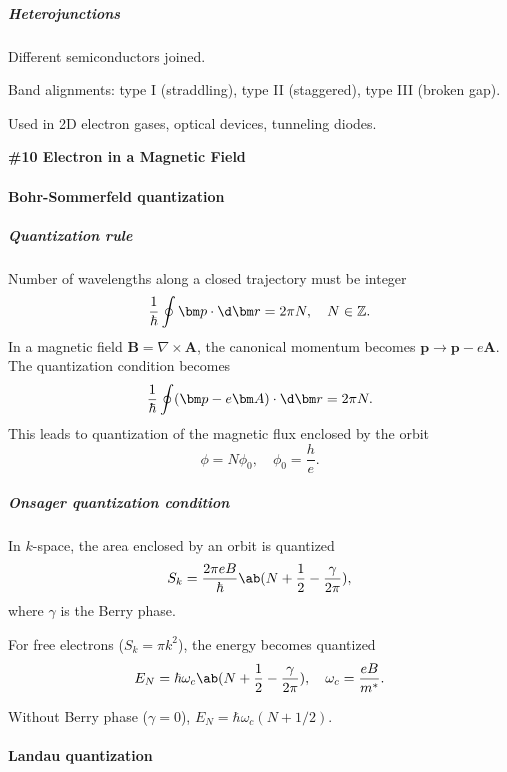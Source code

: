 \subparagraph{Heterojunctions}

\begin{enumext}
  \item Different semiconductors joined.
  \item Band alignments: type I (straddling), type II (staggered),
  type III (broken gap).
  \item Used in 2D electron gases, optical devices, tunneling diodes.
\end{enumext}

\begin{framed}\large\bfseries
  \#10 Electron in a Magnetic Field
\end{framed}

\paragraph{Bohr-Sommerfeld quantization}

\subparagraph{Quantization rule}\leavevmode

Number of wavelengths along a closed trajectory must be integer
\[
  \frac{1}{\hbar} \oint \bm p \cdot \d\bm r = 2\pi N, \quad N \in \mathbb Z.
\]
In a magnetic field $\bm B = \nabla \times \bm A$, the canonical momentum
becomes $\bm p \rightarrow \bm p - e\bm A$. The quantization condition becomes
\[
  \frac{1}{\hbar} \oint (\bm p - e\bm A) \cdot \d\bm r = 2\pi N.
\]
This leads to quantization of the magnetic flux enclosed by the orbit
\[
  \phi = N \phi_0, \quad \phi_0 = \frac he.
\]

\subparagraph{Onsager quantization condition}

\begin{enumext}
  \item In $k$-space, the area enclosed by an orbit is quantized
    \[
      S_k = \frac{2\pi eB}{\hbar} \ab(N + \frac12 - \frac{\gamma}{2\pi}),
    \]
    where $\gamma$ is the Berry phase.
  \item For free electrons ($S_k = \pi k^2$), the energy becomes quantized
    \[
      E_N = \hbar \omega_c \ab(N + \frac12 - \frac{\gamma}{2\pi}), \quad
      \omega_c = \frac{eB}{m^*}.
    \]
  \item Without Berry phase ($\gamma = 0$), $E_N = \hbar \omega_c (N + 1/2)$.
\end{enumext}

\paragraph{Landau quantization}


